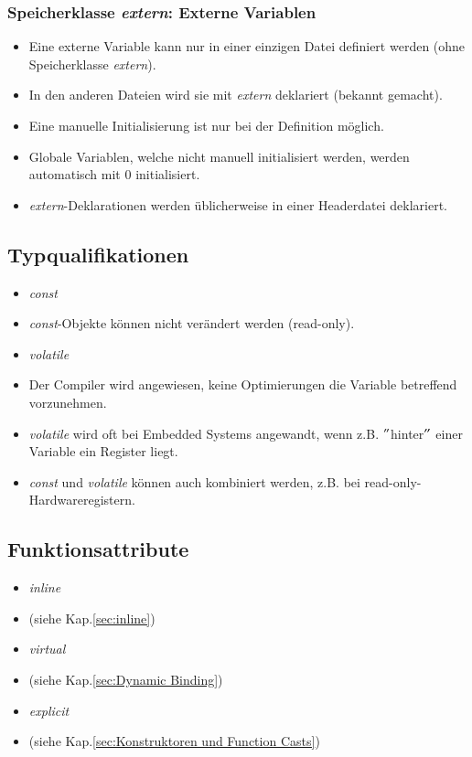 \subsubsection{Speicherklasse \emph{extern}: Externe Variablen}
\begin{itemize}
	\item Eine externe Variable kann nur in einer einzigen Datei definiert werden (ohne Speicherklasse \emph{extern}).
	\item In den anderen Dateien wird sie mit \emph{extern} deklariert (bekannt gemacht).
	\item Eine manuelle Initialisierung ist nur bei der Definition möglich.
	\item Globale Variablen, welche nicht manuell initialisiert werden, werden automatisch mit 0 initialisiert.
	\item \emph{extern}-Deklarationen werden üblicherweise in einer Headerdatei deklariert.
\end{itemize}

\subsection{Typqualifikationen}
\begin{itemize}
	\item \emph{const}
	\item[\-] \emph{const}-Objekte können nicht verändert werden (read-only).
	\item \emph{volatile}
	\item[\-]Der Compiler wird angewiesen, keine Optimierungen die Variable betreffend vorzunehmen.
	\item \emph{volatile} wird oft bei Embedded Systems angewandt, wenn z.B. $"$hinter$"$ einer Variable ein Register liegt.
	\item \emph{const} und \emph{volatile} können auch kombiniert werden, z.B. bei read-only-Hardwareregistern.
\end{itemize}

\subsection{Funktionsattribute}
\begin{itemize}
	\item \emph{inline}
	\item[\-] (siehe Kap.\ref{sec:inline})
	\item \emph{virtual}
	\item[\-] (siehe Kap.\ref{sec:Dynamic Binding})
	\item \emph{explicit}
	\item[\-] (siehe Kap.\ref{sec:Konstruktoren und Function Casts})
\end{itemize}

